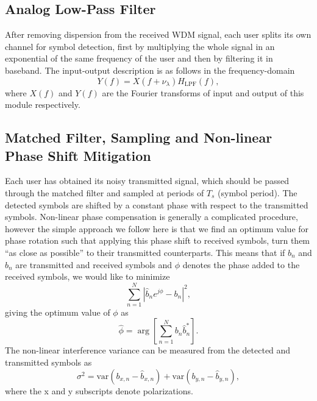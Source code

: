 \documentclass[10pt,letterpaper]{article}
\begin{document}
\subsection{Analog Low-Pass Filter}
After removing dispersion from the received WDM signal, each user splits its own channel for symbol detection, first by multiplying the whole signal in an exponential of the same frequency of the user and then by filtering it in baseband. The input-output description is as follows in the frequency-domain
$$
Y(f)=X(f+\nu_\lambda)H_\text{LPF}(f),
$$
where $X(f)$ and $Y(f)$ are the Fourier transforms of input and output of this module respectively.
\subsection{Matched Filter, Sampling and Non-linear Phase Shift Mitigation}
Each user has obtained its noisy transmitted signal, which should be passed through the matched filter and sampled at periods of $T_s$ (symbol period). The detected symbols are shifted by a constant phase with respect to the transmitted symbols. Non-linear phase compensation is generally a complicated procedure, however the simple approach we follow here is that we find an optimum value for phase rotation such that applying this phase shift to received symbols, turn them ``as close as possible'' to their transmitted counterparts. This means that if $b_n$ and $\hat b_n$ are transmitted and received symbols and $\phi$ denotes the phase added to the received symbols, we would like to minimize
$$
\sum_{n=1}^{N}|\hat b_ne^{j\phi}-b_n|^2,
$$
giving the optimum value of $\phi$ as
$$
\hat\phi=\arg\left[\sum_{n=1}^{N}b_n\hat b_n^*\right].
$$
The non-linear interference variance can be measured from the detected and transmitted symbols as
$$
\sigma^2=\text{var}(b_{x,n}-\hat b_{x,n})+\text{var}(b_{y,n}-\hat b_{y,n}),
$$
where the x and y subscripts denote polarizations.
\end{document}
